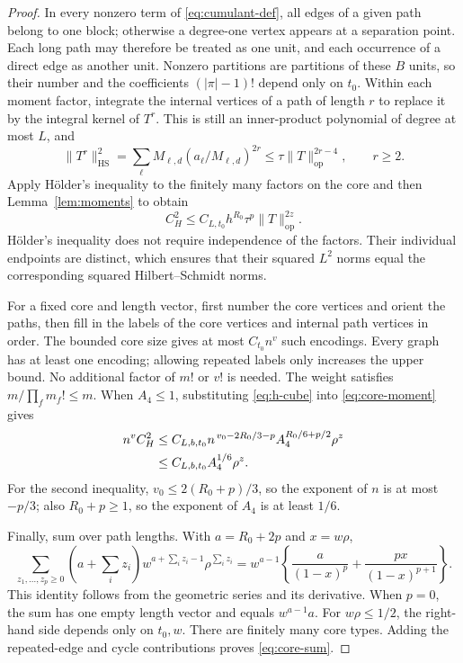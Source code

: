 \documentclass[10pt,a4paper]{amsart}
\begin{document}
\begin{proof}
In every nonzero term of \eqref{eq:cumulant-def}, all edges of a given path belong to one block;
otherwise a degree-one vertex appears at a separation point. Each long path may therefore be treated as one unit,
and each occurrence of a direct edge as another unit.
Nonzero partitions are partitions of these $B$ units, so their number and the coefficients $(|\pi|-1)!$ depend only on $t_0$.
Within each moment factor, integrate the internal vertices of a path of length $r$ to replace it by the integral kernel of $T^r$.
This is still an inner-product polynomial of degree at most $L$, and
\[
 \|T^r\|_{\mathrm{HS}}^2
   =\sum_\ell M_{\ell,d}(a_\ell/M_{\ell,d})^{2r}
   \le \tau\|T\|_{\mathrm{op}}^{2r-4},\qquad r\ge2.
\]
Apply H\"older's inequality to the finitely many factors on the core and then Lemma~\ref{lem:moments}
to obtain
\begin{equation}\label{eq:core-moment}
 C_H^2\le C_{L,t_0}h^{R_0}\tau^p\|T\|_{\mathrm{op}}^{2z}.
\end{equation}
H\"older's inequality does not require independence of the factors. Their individual endpoints are distinct,
which ensures that their squared $L^2$ norms equal the corresponding squared Hilbert--Schmidt norms.

For a fixed core and length vector, first number the core vertices and orient the paths,
then fill in the labels of the core vertices and internal path vertices in order.
The bounded core size gives at most $C_{t_0}n^v$ such encodings.
Every graph has at least one encoding; allowing repeated labels only increases the upper bound.
No additional factor of $m!$ or $v!$ is needed.
The weight satisfies $m/\prod_fm_f!\le m$.
When $A_4\le1$, substituting \eqref{eq:h-cube} into \eqref{eq:core-moment} gives
\begin{align}
 n^vC_H^2
 &\le C_{L,b,t_0}
  n^{\,v_0-2R_0/3-p} A_4^{R_0/6+p/2}\rho^z\notag\\
 &\le C_{L,b,t_0}A_4^{1/6}\rho^z.\label{eq:core-small}
\end{align}
For the second inequality, $v_0\le2(R_0+p)/3$, so the exponent of $n$ is at most $-p/3$;
also $R_0+p\ge1$, so the exponent of $A_4$ is at least $1/6$.

Finally, sum over path lengths. With $a=R_0+2p$ and $x=w\rho$,
\[
 \sum_{z_1,\ldots,z_p\ge0}(a+\textstyle\sum_i z_i)
       w^{a+\sum_i z_i-1}\rho^{\sum_i z_i}
 =w^{a-1}\left\{\frac{a}{(1-x)^p}
             +\frac{px}{(1-x)^{p+1}}\right\}.
\]
This identity follows from the geometric series and its derivative. When $p=0$, the sum has one empty length vector and equals $w^{a-1}a$.
For $w\rho\le1/2$, the right-hand side depends only on $t_0,w$.
There are finitely many core types. Adding the repeated-edge and cycle contributions proves \eqref{eq:core-sum}.
\end{proof}
\end{document}
